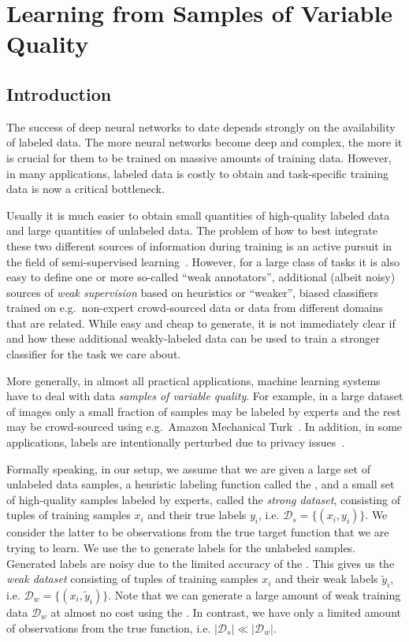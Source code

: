 \chapter{Learning from Samples of Variable Quality}
\label{chap:5}
\section{Introduction}
The success of deep neural networks to date depends strongly on the availability of labeled data. The more neural networks become deep and complex, the more it is crucial for them to be trained on massive amounts of training data. However, in many applications, labeled data is costly to obtain and task-specific training data is now a critical bottleneck. 

Usually it is much easier to obtain small quantities of high-quality labeled data and large quantities of unlabeled data. The problem of how to best integrate these two different sources of information during training is an active pursuit in the field of semi-supervised learning~\citep{chap:semi06}.
However, for a large class of tasks it is also easy to define one or more so-called ``weak annotators'', additional (albeit noisy) sources of \emph{weak supervision} based on heuristics or ``weaker'', biased classifiers trained on e.g.\ non-expert crowd-sourced data or data from different domains that are related. 
While easy and cheap to generate, it is not immediately clear if and how these additional weakly-labeled data can be used to train a stronger classifier for the task we care about.

More generally, in almost all practical applications, machine learning systems have to deal with data \emph{samples of variable quality}. For example, in a large dataset of images only a small fraction of samples may be labeled by experts and the rest may be crowd-sourced using e.g.\ Amazon Mechanical Turk~\citep{Veit:2017}. In addition, in some applications, labels are intentionally perturbed due to privacy issues~\citep{wainwright2012privacy,Papernot:2016, dehghani:2017:neuir}. 

Formally speaking, in our setup, we assume that we are given a large set of unlabeled data samples, a heuristic labeling function called the \emph{\wa}, and a small set of high-quality samples labeled by experts, called the \emph{strong dataset}, consisting of tuples of training samples $x_i$ and their true labels $y_i$, i.e. $\mathcal{D}_s=\{(x_i,y_i)\}$. We consider the latter to be observations from the true target function that we are trying to learn. 
We use the \wa to generate labels for the unlabeled samples. Generated labels are noisy due to the limited accuracy of the \wa. This gives us the \emph{weak dataset} consisting of tuples of training samples $x_i$ and their weak labels $\tilde{y}_i$, i.e. $\mathcal{D}_w=\{(x_i, \tilde{y}_i)\}$.  Note that we can generate a large amount of weak training data $\mathcal{D}_w$ at almost no cost using the \wa. In contrast, we have only a limited amount of observations from the true function, i.e. $|\mathcal{D}_s| \ll |\mathcal{D}_w|$. 

